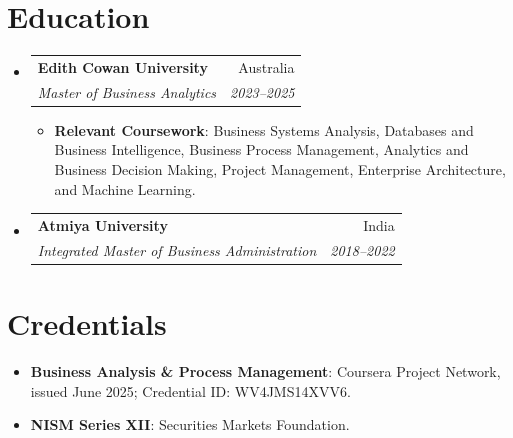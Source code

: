 \documentclass[letterpaper,9.5pt]{article}
\makeatletter
\newcommand{\resumeItem}[2]{
  \item\small{
    \textbf{#1}{: #2 \vspace{-2pt}}
  }
}
\newcommand{\resumeSubheading}[4]{
  \vspace{-1pt}\item
    \begin{tabular*}{0.97\textwidth}{l@{\extracolsep{\fill}}r}
      \textbf{#1} & #2 \\
      \textit{\small #3} & \textit{\small #4} \\
    \end{tabular*}\vspace{-5pt}
}
\newcommand{\resumeSubItem}[2]{\resumeItem{#1}{#2}\vspace{-4pt}}
\newcommand{\resumeSubHeadingListStart}{\begin{itemize}[leftmargin=*]}
\newcommand{\resumeSubHeadingListEnd}{\end{itemize}}
\newcommand{\resumeItemListStart}{\begin{itemize}}
\newcommand{\resumeItemListEnd}{\end{itemize}\vspace{-5pt}}
\makeatother
\begin{document}
\section{Education}
\resumeSubHeadingListStart
  \resumeSubheading
    {Edith Cowan University}{Australia}
    {Master of Business Analytics}{2023--2025}
    \resumeItemListStart
      \resumeItem{Relevant Coursework}
        {Business Systems Analysis, Databases and Business Intelligence, Business Process Management, Analytics and Business Decision Making, Project Management, Enterprise Architecture, and Machine Learning.}
    \resumeItemListEnd
  \resumeSubheading
    {Atmiya University}{India}
    {Integrated Master of Business Administration}{2018--2022}
\resumeSubHeadingListEnd

\section{Credentials}
\resumeSubHeadingListStart
  \resumeSubItem{Business Analysis \& Process Management}
    {Coursera Project Network, issued June 2025; Credential ID: WV4JMS14XVV6.}
  \resumeSubItem{NISM Series XII}
    {Securities Markets Foundation.}
\resumeSubHeadingListEnd
\end{document}
